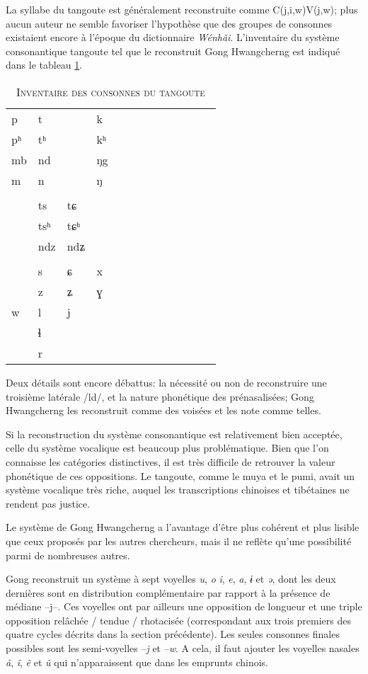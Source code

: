\documentclass[oldfontcommands,twoside,a4paper,11pt,draft]{memoir}
\newcommand{\captionb}[1]{\caption{\textsc{#1}}}
\begin{document}
La syllabe du tangoute est généralement reconstruite comme C(j,i,w)V(j,w); plus aucun auteur ne semble favoriser l'hypothèse que des groupes de consonnes existaient encore à l'époque du dictionnaire \textit{Wénhǎi}.   L'inventaire du système consonantique tangoute tel que le reconstruit Gong Hwangcherng est indiqué dans le tableau \ref{tab:inventaire-tangut}.

\begin{table}
\captionb{Inventaire des consonnes du tangoute}\label{tab:inventaire-tangut}
\begin{tabular}{lllllllllllll} 
p	&	t	&		&			k	&	\\
pʰ	&	tʰ	&		&			kʰ		\\
mb	&	nd	&		&			ŋg	&		\\
m	&	n	&		&			ŋ	&		\\
	&		&		&				&		\\
	&	ts	&	tɕ	&			&		\\
	&	tsʰ	&	tɕʰ		&		&		&		\\
	&	ndz	&	ndʑ		&		&		&		\\
	&		&		&		&		&		&		\\
	&	s	&	ɕ	&				x	&		\\
	&	z	&	ʑ	&			ɣ	&		\\
w	&	l	&			j&	&		&		&		\\
	&	ɬ	&		&		&		&		&		\\
	&r\\
\end{tabular}
\end{table}
Deux détails sont encore débattus: la nécessité ou non de reconstruire une troisième latérale /ld/, et la nature phonétique des prénasalisées; Gong Hwangcherng les reconstruit comme des voisées et les note comme telles.

Si la reconstruction du système consonantique est relativement bien acceptée, celle du système vocalique est beaucoup plus problématique. Bien que l'on connaisse les catégories distinctives, il est très difficile de retrouver la valeur phonétique de ces oppositions. Le tangoute, comme le muya et le pumi, avait un système vocalique très riche, auquel les transcriptions chinoises et tibétaines ne rendent pas justice.

Le système de Gong Hwangcherng a l'avantage d'être plus cohérent et plus lisible que ceux proposés par les autres chercheurs, mais il ne reflète qu'une possibilité parmi de nombreuses autres.

Gong reconstruit un système à sept voyelles \textit{u}, \textit{o} \textit{i}, \textit{e},  \textit{a},  \textit{ɨ} et \textit{ə}, dont les deux dernières sont en distribution complémentaire par rapport à la présence de médiane --j--. Ces voyelles ont par ailleurs une opposition de longueur et une triple opposition  relâchée / tendue / rhotacisée (correspondant aux trois premiers des quatre cycles décrits dans la section précédente). Les seules consonnes finales possibles sont les semi-voyelles --\textit{j} et --\textit{w}. A cela, il faut ajouter les voyelles nasales \textit{ã}, \textit{ĩ}, \textit{ẽ} et \textit{ũ} qui n'apparaissent que dans les emprunts chinois.
\end{document}
